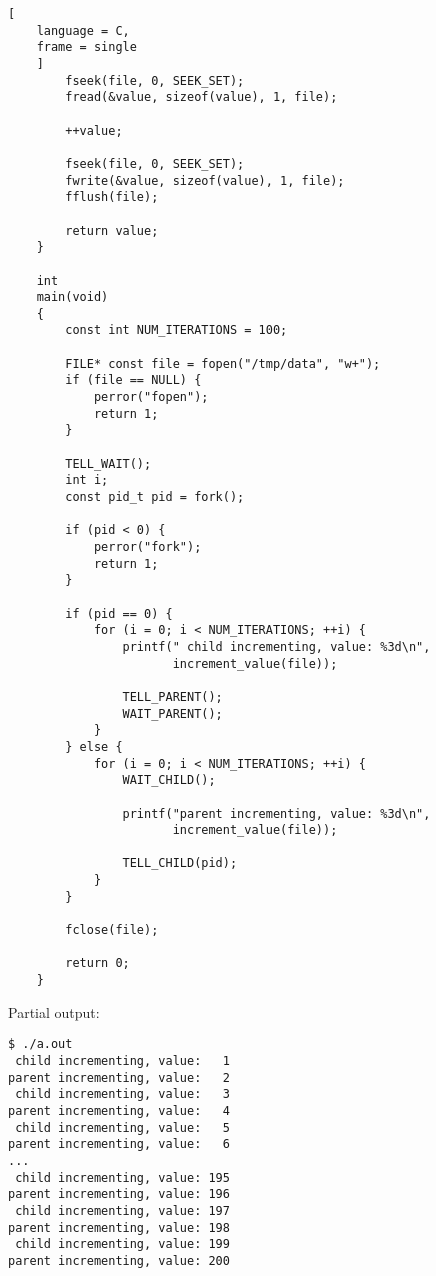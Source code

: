 \documentclass{article}
\begin{document}
\begin{lstlisting}[
    language = C,
    frame = single
    ]
        fseek(file, 0, SEEK_SET);
        fread(&value, sizeof(value), 1, file);

        ++value;

        fseek(file, 0, SEEK_SET);
        fwrite(&value, sizeof(value), 1, file);
        fflush(file);

        return value;
    }

    int
    main(void)
    {
        const int NUM_ITERATIONS = 100;

        FILE* const file = fopen("/tmp/data", "w+");
        if (file == NULL) {
            perror("fopen");
            return 1;
        }

        TELL_WAIT();
        int i;
        const pid_t pid = fork();

        if (pid < 0) {
            perror("fork");
            return 1;
        }

        if (pid == 0) {
            for (i = 0; i < NUM_ITERATIONS; ++i) {
                printf(" child incrementing, value: %3d\n",
                       increment_value(file));

                TELL_PARENT();
                WAIT_PARENT();
            }
        } else {
            for (i = 0; i < NUM_ITERATIONS; ++i) {
                WAIT_CHILD();

                printf("parent incrementing, value: %3d\n",
                       increment_value(file));

                TELL_CHILD(pid);
            }
        }

        fclose(file);

        return 0;
    }
\end{lstlisting}
\large Partial output:
\begin{verbatim}
$ ./a.out
 child incrementing, value:   1
parent incrementing, value:   2
 child incrementing, value:   3
parent incrementing, value:   4
 child incrementing, value:   5
parent incrementing, value:   6
...
 child incrementing, value: 195
parent incrementing, value: 196
 child incrementing, value: 197
parent incrementing, value: 198
 child incrementing, value: 199
parent incrementing, value: 200

\end{verbatim}

\clearpage
\end{document}
